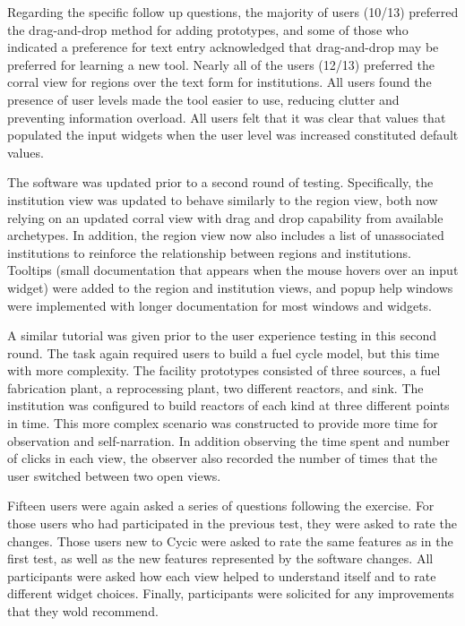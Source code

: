 Regarding the specific follow up questions, the majority of users (10/13)
preferred the drag-and-drop method for adding prototypes, and some of those
who indicated a preference for text entry acknowledged that drag-and-drop may
be preferred for learning a new tool.  Nearly all of the users (12/13)
preferred the corral view for regions over the text form for institutions.
All users found the presence of user levels made the tool easier to use,
reducing clutter and preventing information overload.  All users felt that it
was clear that values that populated the input widgets when the user level was
increased constituted default values.

The software was updated prior to a second round of testing.  Specifically,
the institution view was updated to behave similarly to the region view, both
now relying on an updated corral view with drag and drop capability from
available archetypes.  In addition, the region view now also includes a list
of unassociated institutions to reinforce the relationship between regions and
institutions.  Tooltips (small documentation that appears when the mouse
hovers over an input widget) were added to the region and institution views,
and popup help windows were implemented with longer documentation for most
windows and widgets.

A similar tutorial was given prior to the user experience testing in this
second round.  The task again required users to build a fuel cycle model, but
this time with more complexity.  The facility prototypes consisted of three
sources, a fuel fabrication plant, a reprocessing plant, two different
reactors, and sink.  The institution was configured to build reactors of each
kind at three different points in time.  This more complex scenario was
constructed to provide more time for observation and self-narration.  In
addition observing the time spent and number of clicks in each view, the
observer also recorded the number of times that the user switched between two
open views.

Fifteen users were again asked a series of questions following the exercise.
For those users who had participated in the previous test, they were asked to
rate the changes.  Those users new to Cycic were asked to rate the same
features as in the first test, as well as the new features represented by the
software changes.  All participants were asked how each view helped to
understand \Cyclus itself and to rate different widget choices.  Finally,
participants were solicited for any improvements that they wold recommend.

